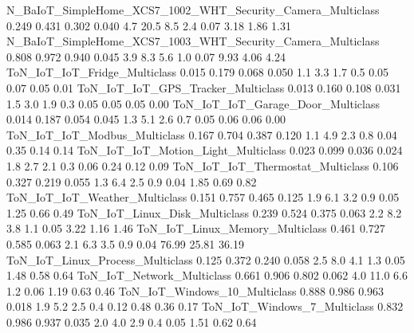 N_BaIoT_SimpleHome_XCS7_1002_WHT_Security_Camera_Multiclass              0.249      0.431       0.302      0.040          4.7         20.5           8.5          2.4         0.07         3.18          1.86         1.31
N_BaIoT_SimpleHome_XCS7_1003_WHT_Security_Camera_Multiclass              0.808      0.972       0.940      0.045          3.9          8.3           5.6          1.0         0.07         9.93          4.06         4.24
ToN_IoT_IoT_Fridge_Multiclass                                            0.015      0.179       0.068      0.050          1.1          3.3           1.7          0.5         0.05         0.07          0.05         0.01
ToN_IoT_IoT_GPS_Tracker_Multiclass                                       0.013      0.160       0.108      0.031          1.5          3.0           1.9          0.3         0.05         0.05          0.05         0.00
ToN_IoT_IoT_Garage_Door_Multiclass                                       0.014      0.187       0.054      0.045          1.3          5.1           2.6          0.7         0.05         0.06          0.06         0.00
ToN_IoT_IoT_Modbus_Multiclass                                            0.167      0.704       0.387      0.120          1.1          4.9           2.3          0.8         0.04         0.35          0.14         0.14
ToN_IoT_IoT_Motion_Light_Multiclass                                      0.023      0.099       0.036      0.024          1.8          2.7           2.1          0.3         0.06         0.24          0.12         0.09
ToN_IoT_IoT_Thermostat_Multiclass                                        0.106      0.327       0.219      0.055          1.3          6.4           2.5          0.9         0.04         1.85          0.69         0.82
ToN_IoT_IoT_Weather_Multiclass                                           0.151      0.757       0.465      0.125          1.9          6.1           3.2          0.9         0.05         1.25          0.66         0.49
ToN_IoT_Linux_Disk_Multiclass                                            0.239      0.524       0.375      0.063          2.2          8.2           3.8          1.1         0.05         3.22          1.16         1.46
ToN_IoT_Linux_Memory_Multiclass                                          0.461      0.727       0.585      0.063          2.1          6.3           3.5          0.9         0.04        76.99         25.81        36.19
ToN_IoT_Linux_Process_Multiclass                                         0.125      0.372       0.240      0.058          2.5          8.0           4.1          1.3         0.05         1.48          0.58         0.64
ToN_IoT_Network_Multiclass                                               0.661      0.906       0.802      0.062          4.0         11.0           6.6          1.2         0.06         1.19          0.63         0.46
ToN_IoT_Windows_10_Multiclass                                            0.888      0.986       0.963      0.018          1.9          5.2           2.5          0.4         0.12         0.48          0.36         0.17
ToN_IoT_Windows_7_Multiclass                                             0.832      0.986       0.937      0.035          2.0          4.0           2.9          0.4         0.05         1.51          0.62         0.64